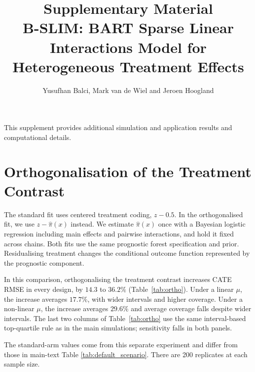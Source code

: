 \documentclass[12pt]{article}
\begin{document}
\title{Supplementary Material\\B-SLIM: BART Sparse Linear Interactions Model for Heterogeneous Treatment Effects}
\author{Yusufhan Balci, Mark van de Wiel and Jeroen Hoogland}
\date{}
\maketitle
\label{SEC:supplement}
\noindent This supplement provides additional simulation and application results and computational details.


\section{Orthogonalisation of the Treatment Contrast}
\label{subsec:ortho_supp}

The standard fit uses centered treatment coding, $z-0.5$. In the orthogonalised fit, we use $z-\hat\pi(x)$ instead. We estimate $\hat\pi(x)$ once with a Bayesian logistic regression including main effects and pairwise interactions, and hold it fixed across chains. Both fits use the same prognostic forest specification and prior. Residualising treatment changes the conditional outcome function represented by the prognostic component.

In this comparison, orthogonalising the treatment contrast increases CATE RMSE in every design, by $14.3$ to $36.2\%$ (Table~\ref{tab:ortho}). Under a linear $\mu$, the increase averages $17.7\%$, with wider intervals and higher coverage. Under a non-linear $\mu$, the increase averages $29.6\%$ and average coverage falls despite wider intervals. The last two columns of Table~\ref{tab:ortho} use the same interval-based top-quartile rule as in the main simulations; sensitivity falls in both panels.

The standard-arm values come from this separate experiment and differ from those in main-text Table \ref{tab:default_scenario}. There are 200 replicates at each sample size.
\end{document}
